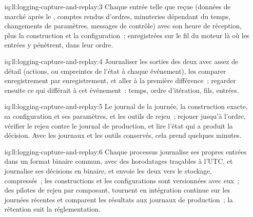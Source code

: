 \begin{solution}{iq:ll:logging-capture-and-replay:3}
Chaque entrée telle que reçue (données de marché après le , comptes rendus d'ordres, minuteries dépendant du temps, changements
de paramètres, messages de contrôle) avec son heure de réception, plus la construction et la configuration~; enregistrées sur le fil du moteur là
où les entrées y pénètrent, dans leur ordre.
\end{solution}

\begin{solution}{iq:ll:logging-capture-and-replay:4}
Journaliser les sorties des deux avec assez de détail (actions, ou empreintes de l'état à chaque événement), les comparer enregistrement par
enregistrement, et aller à la première différence~; regarder ensuite ce qui différait à cet événement~: temps, ordre d'itération, fils, entrées.
\end{solution}

\begin{solution}{iq:ll:logging-capture-and-replay:5}
Le journal de la journée, la construction exacte, sa configuration et ses paramètres, et les outils de rejeu~; rejouer jusqu'à l'ordre, vérifier le
rejeu contre le journal de production, et lire l'état qui a produit la décision. Avec les journaux et les outils conservés, cela prend
quelques minutes.
\end{solution}

\begin{solution}{iq:ll:logging-capture-and-replay:6}
Chaque processus journalise ses propres entrées dans un format binaire commun, avec des horodatages traçables à l'UTC, et journalise ses décisions en
binaire, et envoie les deux vers le stockage, compressés~; les constructions et les configurations sont versionnées avec eux~; des pilotes de rejeu
par composant, tournent en intégration continue sur les journées récentes et comparent les résultats aux journaux de production~; la rétention suit la réglementation.
\end{solution}
